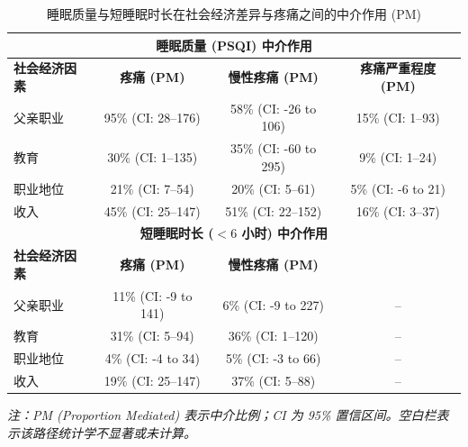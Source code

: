 \documentclass[lang=cn,a4paper,newtx,code=minted,codebg=light]{elegantpaper}
\begin{document}
\vspace*{1.5em}

\begin{table}[H]
    \centering
    \caption{睡眠质量与短睡眠时长在社会经济差异与疼痛之间的中介作用 (PM)}
    \label{tab:mediation_results}
    \renewcommand{\arraystretch}{1.3}
    \begin{tabularx}{\textwidth}{l c c c}
        \toprule
        \multicolumn{4}{c}{\textbf{睡眠质量 (PSQI) 中介作用}} \\
        \midrule
        \textbf{社会经济因素} & \textbf{疼痛 (PM)} & \textbf{慢性疼痛 (PM)} & \textbf{疼痛严重程度 (PM)} \\
        \midrule
        父亲职业 & 95\% (CI: 28--176) & 58\% (CI: -26 to 106) & 15\% (CI: 1--93) \\
        教育 & 30\% (CI: 1--135) & 35\% (CI: -60 to 295) & 9\% (CI: 1--24) \\
        职业地位 & 21\% (CI: 7--54) & 20\% (CI: 5--61) & 5\% (CI: -6 to 21) \\
        收入 & 45\% (CI: 25--147) & 51\% (CI: 22--152) & 16\% (CI: 3--37) \\
        \midrule
        \multicolumn{4}{c}{\textbf{短睡眠时长 ($<6$ 小时) 中介作用}} \\
        \midrule
        \textbf{社会经济因素} & \textbf{疼痛 (PM)} & \textbf{慢性疼痛 (PM)} & \textbf{} \\
        \midrule
        父亲职业 & 11\% (CI: -9 to 141) & 6\% (CI: -9 to 227) & -- \\
        教育 & 31\% (CI: 5--94) & 36\% (CI: 1--120) & -- \\
        职业地位 & 4\% (CI: -4 to 34) & 5\% (CI: -3 to 66) & -- \\
        收入 & 19\% (CI: 25--147) & 37\% (CI: 5--88) & -- \\
        \bottomrule
    \end{tabularx}
    \vspace{0.5em}
    \footnotesize{\textit{注：PM (Proportion Mediated) 表示中介比例；CI 为 95\% 置信区间。空白栏表示该路径统计学不显著或未计算。}}
\end{table}
\end{document}
